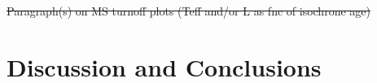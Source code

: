 \documentclass[useAMS,usenatbib]{mnras}
\providecommand{\DIFdel}[1]{{\protect\color{red}\sout{#1}}}                      %
\providecommand{\DIFdelbegin}{} %
\providecommand{\DIFdelend}{} %
\newcommand{\DIFscaledelfig}{0.5}
\newlength{\DIFdelgraphicswidth} %
\newlength{\DIFdelgraphicsheight} %
\newcommand{\DIFdelincludegraphics}[2][]{%
\sbox{\DIFdelgraphicsbox}{\DIFOincludegraphics[#1]{#2}}%
\settoboxwidth{\DIFdelgraphicswidth}{\DIFdelgraphicsbox} %
\settoboxtotalheight{\DIFdelgraphicsheight}{\DIFdelgraphicsbox} %
\scalebox{\DIFscaledelfig}{%
\parbox[b]{\DIFdelgraphicswidth}{\usebox{\DIFdelgraphicsbox}\\[-\baselineskip] \rule{\DIFdelgraphicswidth}{0em}}\llap{\resizebox{\DIFdelgraphicswidth}{\DIFdelgraphicsheight}{%
\setlength{\unitlength}{\DIFdelgraphicswidth}%
\begin{picture}(1,1)%
\thicklines\linethickness{2pt} %
{\color[rgb]{1,0,0}\put(0,0){\framebox(1,1){}}}%
{\color[rgb]{1,0,0}\put(0,0){\line( 1,1){1}}}%
{\color[rgb]{1,0,0}\put(0,1){\line(1,-1){1}}}%
\end{picture}%
}\hspace*{3pt}}} %
} %
\DeclareRobustCommand{\DIFdelbegin}{\DIFOdelbegin \let\includegraphics\DIFdelincludegraphics} %
\DeclareRobustCommand{\DIFdelend}{\DIFOaddend \let\includegraphics\DIFOincludegraphics} %
\begin{document}
\DIFdelbegin %
\DIFdel{Paragraph(s) on MS turnoff plots (Teff and/or L as fnc of isochrone age)}%
\DIFdelend %


\section{Discussion and Conclusions}
\label{sec:discus}

\DIFdelbegin %
\DIFdelend %
\end{document}
